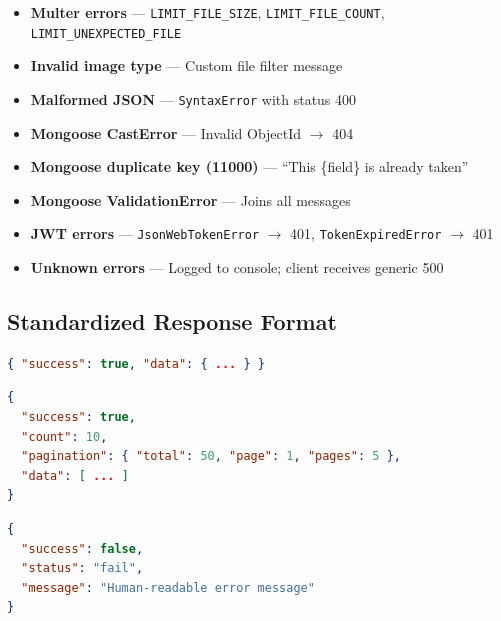 \begin{itemize}
  \item \textbf{Multer errors} --- \texttt{LIMIT\_FILE\_SIZE}, \texttt{LIMIT\_FILE\_COUNT}, \texttt{LIMIT\_UNEXPECTED\_FILE}
  \item \textbf{Invalid image type} --- Custom file filter message
  \item \textbf{Malformed JSON} --- \texttt{SyntaxError} with status 400
  \item \textbf{Mongoose CastError} --- Invalid ObjectId $\rightarrow$ 404
  \item \textbf{Mongoose duplicate key (11000)} --- ``This \{field\} is already taken''
  \item \textbf{Mongoose ValidationError} --- Joins all messages
  \item \textbf{JWT errors} --- \texttt{JsonWebTokenError} $\rightarrow$ 401, \texttt{TokenExpiredError} $\rightarrow$ 401
  \item \textbf{Unknown errors} --- Logged to console; client receives generic 500
\end{itemize}

\subsection{Standardized Response Format}

\begin{lstlisting}[language=json,title=Success (single item)]
{ "success": true, "data": { ... } }
\end{lstlisting}

\begin{lstlisting}[language=json,title=Success (paginated list)]
{
  "success": true,
  "count": 10,
  "pagination": { "total": 50, "page": 1, "pages": 5 },
  "data": [ ... ]
}
\end{lstlisting}

\begin{lstlisting}[language=json,title=Error]
{
  "success": false,
  "status": "fail",
  "message": "Human-readable error message"
}
\end{lstlisting}
